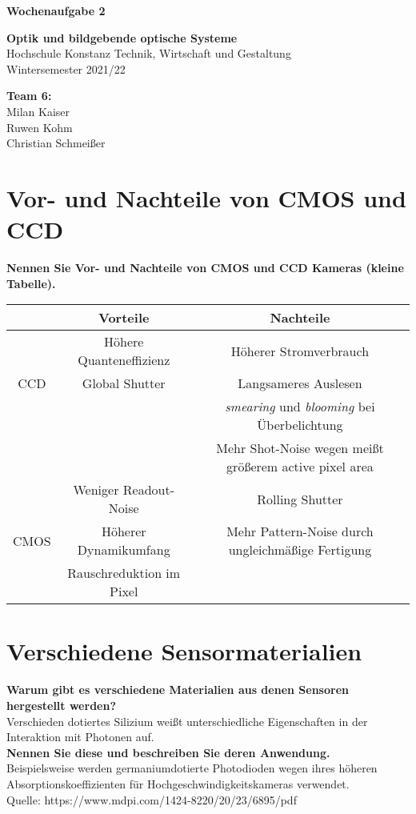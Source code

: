 \documentclass[a4paper]{article}
\begin{document}
	\thispagestyle{empty}
	
	\begin{center}\strut
		\bfseries\Huge
		Wochenaufgabe 2
	\end{center}
	\vfill
	
	\begin{center}\strut
		\textbf{Optik und bildgebende optische Systeme}\\
		Hochschule Konstanz Technik, Wirtschaft und Gestaltung\\
		Wintersemester 2021/22
	\end{center}
	
	\begin{center}\strut
		\textbf{Team 6:}\\
		Milan Kaiser\\
		Ruwen Kohm\\
		Christian Schmeißer\\
	\end{center}
	\vfill
	\vfill

	\clearpage
	
	\section{Vor- und Nachteile von CMOS und CCD}
	\textbf{Nennen Sie Vor- und Nachteile von CMOS und CCD Kameras (kleine Tabelle).}
	\begin{center}
		\begin{tabular}{ c|c|c }
			       & Vorteile & Nachteile \\ 
			       \hline
			       & Höhere Quanteneffizienz &  Höherer Stromverbrauch\\
			CCD	   & Global Shutter &  Langsameres Auslesen\\
				   & & \textit{smearing} und \textit{blooming} bei Überbelichtung\\
				   & & Mehr Shot-Noise wegen meißt größerem active pixel area\\
				   \hline  
			       & Weniger Readout-Noise & Rolling Shutter \\ 
			CMOS   & Höherer Dynamikumfang & Mehr Pattern-Noise durch ungleichmäßige Fertigung \\
			       & Rauschreduktion im Pixel & \\
		\end{tabular}
	\end{center}
	
	\section{Verschiedene Sensormaterialien}
	\textbf{Warum gibt es verschiedene Materialien aus denen Sensoren hergestellt werden?}\\
	Verschieden dotiertes Silizium weißt unterschiedliche Eigenschaften in der Interaktion mit Photonen auf.\\
	\textbf{Nennen Sie diese und beschreiben Sie deren Anwendung.}\\
	Beispielsweise werden germaniumdotierte Photodioden wegen ihres höheren Absorptionskoeffizienten für Hochgeschwindigkeitskameras verwendet.\\
	Quelle: https://www.mdpi.com/1424-8220/20/23/6895/pdf
	
\end{document}
